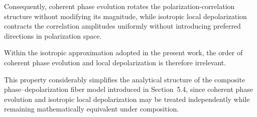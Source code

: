 Consequently, coherent phase evolution rotates the polarization-correlation structure without modifying its magnitude, while isotropic local depolarization contracts the correlation amplitudes uniformly without introducing preferred directions in polarization space.

\medskip

Within the isotropic approximation adopted in the present work, the order of coherent phase evolution and local depolarization is therefore irrelevant.

\medskip

This property considerably simplifies the analytical structure of the composite phase--depolarization fiber model introduced in Section~5.4, since coherent phase evolution and isotropic local depolarization may be treated independently while remaining mathematically equivalent under composition.